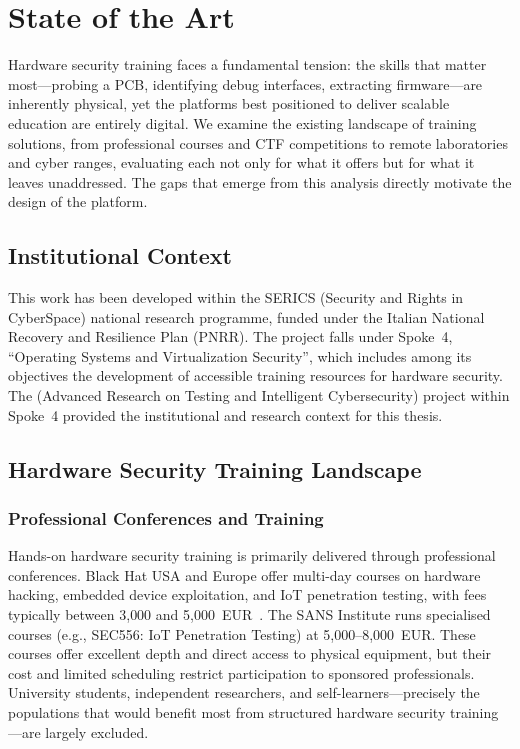 \chapter{State of the Art}\label{chap:stateoftheart}

Hardware security training faces a fundamental tension: the skills that matter most---probing a PCB, identifying debug interfaces, extracting firmware---are inherently physical, yet the platforms best positioned to deliver scalable education are entirely digital. We examine the existing landscape of training solutions, from professional courses and CTF competitions to remote laboratories and cyber ranges, evaluating each not only for what it offers but for what it leaves unaddressed. The gaps that emerge from this analysis directly motivate the design of the \pcbctf{} platform.

\section{Institutional Context}\label{sec:institutional}

This work has been developed within the SERICS (Security and Rights in CyberSpace) national research programme, funded under the Italian National Recovery and Resilience Plan (PNRR). The project falls under Spoke~4, ``Operating Systems and Virtualization Security'', which includes among its objectives the development of accessible training resources for hardware security. The \artic{} (Advanced Research on Testing and Intelligent Cybersecurity) project within Spoke~4 provided the institutional and research context for this thesis.

\section{Hardware Security Training Landscape}\label{sec:training}

\subsection{Professional Conferences and Training}\label{subsec:professional}

Hands-on hardware security training is primarily delivered through professional conferences. Black Hat USA and Europe offer multi-day courses on hardware hacking, embedded device exploitation, and IoT penetration testing, with fees typically between 3{,}000 and 5{,}000~EUR~\cite{genova2025}. The SANS Institute runs specialised courses (e.g., SEC556: IoT Penetration Testing) at 5{,}000--8{,}000~EUR. These courses offer excellent depth and direct access to physical equipment, but their cost and limited scheduling restrict participation to sponsored professionals. University students, independent researchers, and self-learners---precisely the populations that would benefit most from structured hardware security training---are largely excluded.

